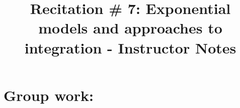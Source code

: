 \documentclass[handout, instructornotes]{ximera}
\title{Recitation \# 7: Exponential models and approaches to integration - Instructor Notes}
\begin{document}
\begin{abstract}		\end{abstract}
\maketitle

\section{Group work:}
\end{document}
